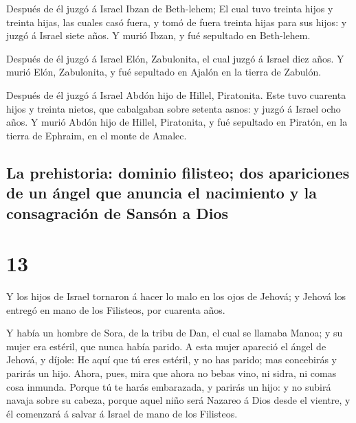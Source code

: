  Después de él juzgó á Israel Ibzan de Beth-lehem;
 El cual tuvo treinta hijos y treinta hijas, las cuales
casó fuera, y tomó de fuera treinta hijas para sus hijos: y juzgó á
Israel siete años.  Y murió Ibzan, y fué sepultado en
Beth-lehem.

 Después de él juzgó á Israel Elón, Zabulonita, el cual
juzgó á Israel diez años.  Y murió Elón, Zabulonita, y
fué sepultado en Ajalón en la tierra de Zabulón.

 Después de él juzgó á Israel Abdón hijo de Hillel,
Piratonita.  Este tuvo cuarenta hijos y treinta nietos,
que cabalgaban sobre setenta asnos: y juzgó á Israel ocho años.
 Y murió Abdón hijo de Hillel, Piratonita, y fué
sepultado en Piratón, en la tierra de Ephraim, en el monte de Amalec.

\hypertarget{la-prehistoria-dominio-filisteo-dos-apariciones-de-un-uxe1ngel-que-anuncia-el-nacimiento-y-la-consagraciuxf3n-de-sansuxf3n-a-dios}{%
\subsection{La prehistoria: dominio filisteo; dos apariciones de un
ángel que anuncia el nacimiento y la consagración de Sansón a
Dios}\label{la-prehistoria-dominio-filisteo-dos-apariciones-de-un-uxe1ngel-que-anuncia-el-nacimiento-y-la-consagraciuxf3n-de-sansuxf3n-a-dios}}

\hypertarget{section-07-13}{%
\section{13}\label{section-07-13}}

 Y los hijos de Israel tornaron á hacer lo malo en los
ojos de Jehová; y Jehová los entregó en mano de los Filisteos, por
cuarenta años.

 Y había un hombre de Sora, de la tribu de Dan, el cual se
llamaba Manoa; y su mujer era estéril, que nunca había parido.
 A esta mujer apareció el ángel de Jehová, y díjole: He
aquí que tú eres estéril, y no has parido; mas concebirás y parirás un
hijo.  Ahora, pues, mira que ahora no bebas vino, ni
sidra, ni comas cosa inmunda.  Porque tú te harás
embarazada, y parirás un hijo: y no subirá navaja sobre su cabeza,
porque aquel niño será Nazareo á Dios desde el vientre, y él comenzará á
salvar á Israel de mano de los Filisteos.

